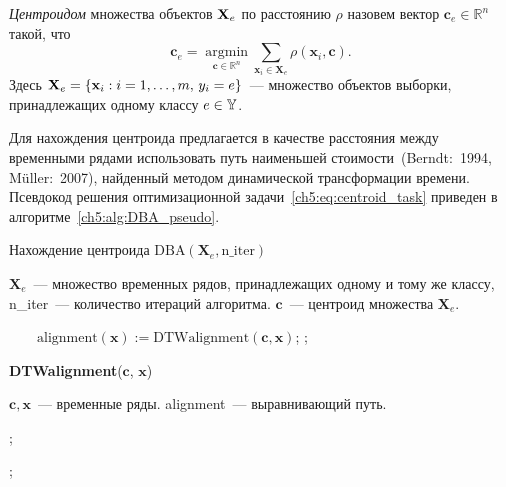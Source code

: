\documentclass[11pt, a5paper]{dissert}
\begin{document}
\begin{definition}
	\textit{Центроидом} множества объектов $\mathbf{X}_e$ по расстоянию $\rho$ назовем вектор $\mathbf{c}_e \in \mathbb{R}^n$ такой, что
	\begin{equation}
		\label{ch5:eq:centroid_task}
		\mathbf{c}_e = \mathop{\text{argmin}}\limits_{{\mathbf{c} \in \mathbb{R}^n}}\sum_{\mathbf{x}_i \in \mathbf{X}_e}
		{\rho(\mathbf{x}_i ,\mathbf{c})}.
	\end{equation}
	Здесь $\mathbf{X}_e = \{\mathbf{x}_i: i=1, \dots, m, \, y_i=e\}$~--- множество объектов выборки, принадлежащих одному классу $e \in \mathbb{Y}$.
\end{definition}

Для нахождения центроида предлагается в качестве расстояния между временными рядами использовать путь наименьшей стоимости~(Berndt:~1994, M{\"u}ller:~2007), найденный методом динамической трансформации времени.
Псевдокод решения оптимизационной задачи~\eqref{ch5:eq:centroid_task} приведен в алгоритме~\ref{ch5:alg:DBA_pseudo}.
\begin{algorithm}[!t]
	\caption{Нахождение центроида $\text{DBA}(\mathbf{X}_e, \text{n\_iter})$}
	\label{ch5:alg:DBA_pseudo}
	\begin{algorithmic}[1]
		\REQUIRE $\mathbf{X}_e$~--- множество временных рядов, принадлежащих одному и тому же классу, n\_iter~--- количество итераций алгоритма.
		\ENSURE $\mathbf{c}$~--- центроид множества $\mathbf{X}_e$.
		
		\STATEx $ \quad \quad \text{alignment}(\mathbf{x}) := \text{DTWalignment}(\mathbf{c}, \mathbf{x})$;
		\ENDFOR
		;
		\ENDFOR
	\end{algorithmic}

	\textbf{DTWalignment}($\mathbf{c}$, $\mathbf{x}$)
	\begin{algorithmic}[1]
		\REQUIRE $\mathbf{c}, \mathbf{x}$~--- временные ряды.
		\ENSURE alignment~--- выравнивающий путь.
		
		;
		
		;
	\end{algorithmic}
\end{algorithm}
\end{document}
